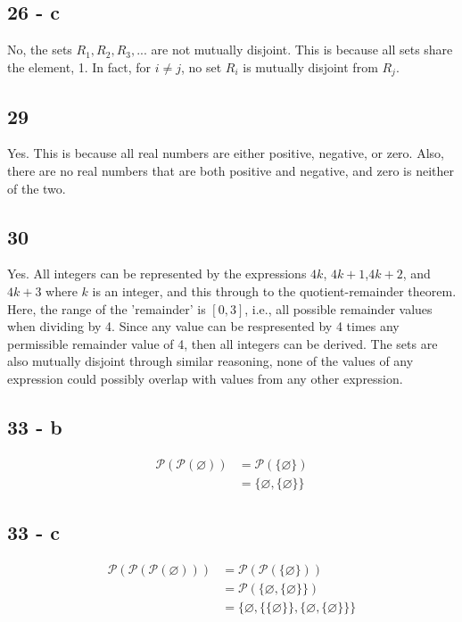 \documentclass[12pt]{article}
\begin{document}
\subsection*{26 - c}
No, the sets $R_1, R_2, R_3,$... are not mutually disjoint. 
This is because all sets share the element, 1. In fact, for $i \neq j$, no set $R_i$ is mutually disjoint from $R_j$. 

\subsection*{29}
Yes. This is because all real numbers are either positive, negative, or zero. Also, there are no real numbers that are both positive and negative, and zero is neither of the two. 

\subsection*{30}
Yes. All integers can be represented by the expressions $4k$, $4k+1$,$4k+2$, and $4k+3$ where $k$ is an integer, and this through to the quotient-remainder theorem. Here, the range of the 'remainder' is $[0,3]$, i.e., all possible remainder values when dividing by 4. Since any value can be respresented by 4 times any permissible remainder value of 4, then all integers can be derived. The sets are also mutually disjoint through similar reasoning, none of the values of any expression could possibly overlap with values from any other expression.

\subsection*{33 - b}
\begin{align*}
    \mathscr{P}(\mathscr{P}(\varnothing)) &= \mathscr{P}(\{\varnothing\}) \\
    &= \{\varnothing,\{\varnothing\}\}
\end{align*}

\subsection*{33 - c}
\begin{align*}
    \mathscr{P}(\mathscr{P}(\mathscr{P}(\varnothing))) &= \mathscr{P}(\mathscr{P}(\{\varnothing\})) \\
    &= \mathscr{P}(\{\varnothing,\{\varnothing\}\}) \\
    &= \{ \varnothing, \{\{\varnothing\}\}, \{ \varnothing, \{\varnothing\}\}\}
\end{align*}
\end{document}
